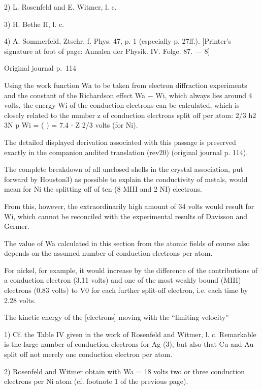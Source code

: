 \documentclass[10pt]{article}
\newcommand{\origpage}[1]{\par\medskip\noindent\hfill{\small\color{notegray}Original journal p.~#1}\hfill\mbox{}\par\smallskip}
\begin{document}
\noindent\footnotesize 2) L. Rosenfeld and E. Witmer, l. c.\par\normalsize
\noindent\footnotesize 3) H. Bethe II, l. c.\par\normalsize
\noindent\footnotesize 4) A. Sommerfeld, Ztschr. f. Phys. 47, p. 1 (especially p. 27ff.). [Printer’s signature at foot of page: Annalen der Physik. IV. Folge. 87. — 8]\par\normalsize
\origpage{114}
Using the work function Wa to be taken from electron diffraction experiments and the constant of the Richardson effect Wa − Wi, which always lies around 4 volts, the energy Wi of the conduction electrons can be calculated, which is closely related to the number z of conduction electrons split off per atom: 2/3 h2 3N p Wi = ( ) = 7.4 ⋅ Z 2/3 volts (for Ni).\par
The detailed displayed derivation associated with this passage is preserved exactly in the companion audited translation (rev20) (original journal p. 114).\par
The complete breakdown of all unclosed shells in the crystal association, put forward by Houston3) as possible to explain the conductivity of metals, would mean for Ni the splitting off of ten (8 MIII and 2 NI) electrons.\par
From this, however, the extraordinarily high amount of 34 volts would result for Wi, which cannot be reconciled with the experimental results of Davisson and Germer.\par
The value of Wa calculated in this section from the atomic fields of course also depends on the assumed number of conduction electrons per atom.\par
For nickel, for example, it would increase by the difference of the contributions of a conduction electron (3.11 volts) and one of the most weakly bound (MIII) electrons (0.83 volts) to V0 for each further split-off electron, i.e. each time by 2.28 volts.\par
The kinetic energy of the [electrons] moving with the “limiting velocity”\par
\noindent\footnotesize 1) Cf. the Table IV given in the work of Rosenfeld and Witmer, l. c. Remarkable is the large number of conduction electrons for Ag (3), but also that Cu and Au split off not merely one conduction electron per atom.\par\normalsize
\noindent\footnotesize 2) Rosenfeld and Witmer obtain with Wa = 18 volts two or three conduction electrons per Ni atom (cf. footnote 1 of the previous page).\par\normalsize
\end{document}
